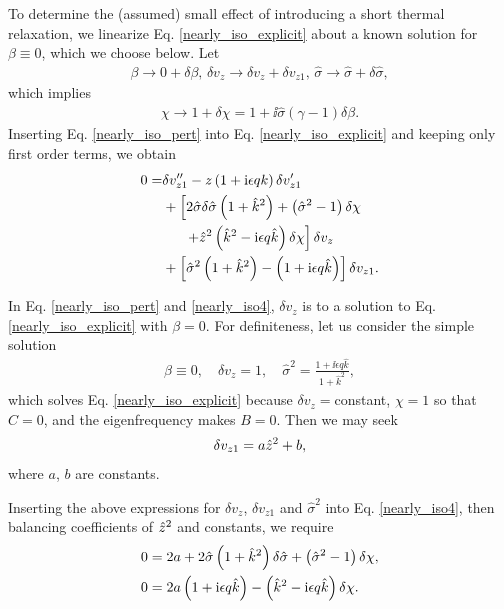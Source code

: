 To determine the (assumed) small effect of introducing a short thermal
relaxation, we linearize Eq. \ref{nearly_iso_explicit} about a known 
solution for $\beta\equiv0$, which we choose below. Let  
\begin{align}\label{nearly_iso_pert}
  \beta \to 0 + \delta\beta,\, \delta v_z\to \delta v_z+\delta
  v_{z1},\,\hat{\sigma} \to \hat{\sigma} + \delta\hat{\sigma}, 
\end{align}
which implies 
\begin{align}
  \chi \to 1 + \delta\chi = 1 + \ii \hat{\sigma}\left(\gamma-1\right)\delta\beta.
\end{align}
Inserting Eq. \ref{nearly_iso_pert} into Eq. \ref{nearly_iso_explicit}
and keeping only first order terms, we obtain  
\begin{align}
 0 =& \delta v_{z1}^{\prime\prime} - z\left(1 + \mathrm{i}\epsilon q
   k\right)\delta v_{z1}^\prime\notag\\
 &+ \left[2\hat{\sigma}\delta\hat{\sigma}\left(1 + \hat{k}^2\right) +
   \left(\hat{\sigma}^2 - 1\right)\delta\chi \right.\notag\\
&\phantom{++} \left. + \hat{z}^2\left(\hat{k}^2 -
     \mathrm{i}\epsilon q \hat{k}\right)\delta\chi\right]\delta v_z\notag\\
 &+\left[\hat{\sigma}^2\left(1 + \hat{k}^2\right) - \left(1+\mathrm{i}\epsilon
     q \hat{k}\right)\right]\delta v_{z1}.\label{nearly_iso4}
\end{align}

In Eq. \ref{nearly_iso_pert} and \ref{nearly_iso4}, $\delta v_z$ is to
a solution to Eq. \ref{nearly_iso_explicit} with 
$\beta=0$. For definiteness, let us consider the simple solution 
\begin{align}
  \beta\equiv 0, \quad \delta v_z = 1,\quad \hat{\sigma}^2 = \frac{1 +
  \ii\epsilon q \hat{k}}{1+\hat{k}^2}, \label{pert_basic} 
\end{align}
which solves Eq. \ref{nearly_iso_explicit} because $\delta
v_z=$constant, $\chi=1$ so that $C=0$, and the eigenfrequency makes
$B=0$. Then we may seek 
\begin{align}
  \delta v_{z1} = a \hat{z}^2 + b,
\end{align}
where $a$, $b$ are constants. 


Inserting the above expressions for $\delta v_z$, $\delta v_{z1}$ and
$\hat{\sigma}^2$ into Eq. \ref{nearly_iso4}, then balancing
coefficients of $\hat{z}^2$ and constants, we require
\begin{align}
  0 &= 2a + 2\hat{\sigma}\left(1+\hat{k}^2\right)\delta\hat{\sigma} +
  \left(\hat{\sigma}^2 -1\right)\delta\chi,\notag\\
  0&= 2a\left(1+\mathrm{i}\epsilon q \hat{k}\right) - \left(\hat{k}^2 - \mathrm{i}\epsilon
    q \hat{k}\right)\delta\chi.
\end{align} 

